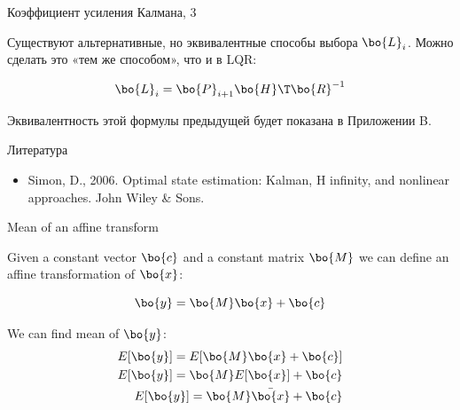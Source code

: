 \documentclass{beamer}
\begin{document}
\begin{frame}{Коэффициент усиления Калмана, 3}
	\begin{flushleft}
		
		Существуют альтернативные, но эквивалентные способы выбора $\bo{L}_i$. Можно сделать это «тем же способом», что и в LQR:
		
		\begin{equation}
			\bo{L}_i = \bo{P}_{i+1} \bo{H}\T \bo{R}^{-1}
		\end{equation}
		
		Эквивалентность этой формулы предыдущей будет показана в Приложении B.
		
		
	\end{flushleft}
\end{frame}

\begin{frame}{Литература}
	\begin{flushleft}
		
		\begin{itemize}
			\item Simon, D., 2006. Optimal state estimation: Kalman, H infinity, and nonlinear approaches. John Wiley \& Sons.
		\end{itemize}
		
	\end{flushleft}
\end{frame}


\myqrframe



\begin{frame}
	\begin{flushleft}
		
		
	\end{flushleft}
\end{frame}

\begin{frame}{Mean of an affine transform}
	\begin{flushleft}
		
		Given a constant vector $\bo{c}$ and a constant matrix $\bo{M}$ we can define an affine transformation of $\bo{x}$:
		
		\begin{equation}
			\bo{y} = \bo{M}\bo{x} + \bo{c}
		\end{equation}
		
		We can find mean of $\bo{y}$:
		\begin{align}
			E[\bo{y}] = E[\bo{M}\bo{x} + \bo{c}] \\
			E[\bo{y}] = \bo{M}E[\bo{x}] + \bo{c} \\
			E[\bo{y}] = \bo{M}\bar{\bo{x}} + \bo{c}
		\end{align}
		
		
	\end{flushleft}
\end{frame}
\end{document}
